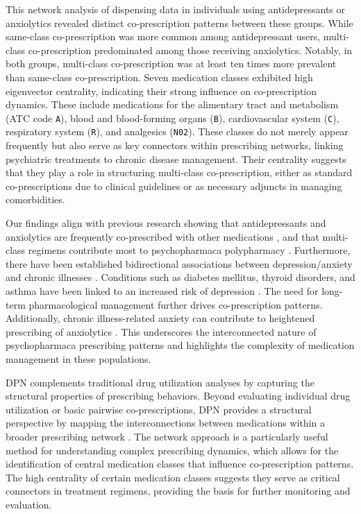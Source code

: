 \documentclass[
  authoryear,
  review]{elsarticle}
\begin{document}
This network analysis of dispensing data in individuals using
antidepressants or anxiolytics revealed distinct co-prescription
patterns between these groups. While same-class co-prescription was more
common among antidepressant users, multi-class co-prescription
predominated among those receiving anxiolytics. Notably, in both groups,
multi-class co-prescription was at least ten times more prevalent than
same-class co-prescription. Seven medication classes exhibited high
eigenvector centrality, indicating their strong influence on
co-prescription dynamics. These include medications for the alimentary
tract and metabolism (ATC code \texttt{A}), blood and blood-forming
organs (\texttt{B}), cardiovascular system (\texttt{C}), respiratory
system (\texttt{R}), and analgesics (\texttt{N02}). These classes do not
merely appear frequently but also serve as key connectors within
prescribing networks, linking psychiatric treatments to chronic disease
management. Their centrality suggests that they play a role in
structuring multi-class co-prescription, either as standard
co-prescriptions due to clinical guidelines or as necessary adjuncts in
managing comorbidities.

Our findings align with previous research showing that antidepressants
and anxiolytics are frequently co-prescribed with other medications
\citep{Shrivastava2013}, and that multi-class regimens contribute most
to psychopharmaca polypharmacy \citep{de2004polypharmacy}. Furthermore,
there have been established bidirectional associations between
depression/anxiety and chronic illnesses \citep{qi2024longitudinal}.
Conditions such as diabetes mellitus, thyroid disorders, and asthma have
been linked to an increased risk of depression \citep{jang2024temporal}.
The need for long-term pharmacological management further drives
co-prescription patterns. Additionally, chronic illness-related anxiety
can contribute to heightened prescribing of anxiolytics
\citep{lebel2020health}. This underscores the interconnected nature of
psychopharmaca prescribing patterns and highlights the complexity of
medication management in these populations.

DPN complements traditional drug utilization analyses by capturing the
structural properties of prescribing behaviors. Beyond evaluating
individual drug utilization or basic pairwise co-prescriptions, DPN
provides a structural perspective by mapping the interconnections
between medications within a broader prescribing network
\citep{Bazzoni2015}. The network approach is a particularly useful
method for understanding complex prescribing dynamics, which allows for
the identification of central medication classes that influence
co-prescription patterns. The high centrality of certain medication
classes suggests they serve as critical connectors in treatment
regimens, providing the basis for further monitoring and evaluation.
\end{document}
